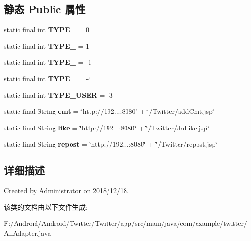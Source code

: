 \subsection*{静态 Public 属性}
\begin{DoxyCompactItemize}
\item 
\mbox{\label{classcom_1_1example_1_1twitter_1_1_all_adapter_aab2cef272665de169b88e509eb07ebe1}} 
static final int {\bfseries T\+Y\+P\+E\+\_} = 0
\item 
\mbox{\label{classcom_1_1example_1_1twitter_1_1_all_adapter_ac4e893228ffc32d25798e88c4b058dd8}} 
static final int {\bfseries T\+Y\+P\+E\+\_} = 1
\item 
\mbox{\label{classcom_1_1example_1_1twitter_1_1_all_adapter_ac3a1bd4e58dd541ebae6aea912ba10e6}} 
static final int {\bfseries T\+Y\+P\+E\+\_} = -\/1
\item 
\mbox{\label{classcom_1_1example_1_1twitter_1_1_all_adapter_a689fca9cb3ac46ce5fe3d409028d404b}} 
static final int {\bfseries T\+Y\+P\+E\+\_} = -\/4
\item 
\mbox{\label{classcom_1_1example_1_1twitter_1_1_all_adapter_acd08e166b930067ca3a858bfcc4ff216}} 
static final int {\bfseries T\+Y\+P\+E\+\_\+\+U\+S\+ER} = -\/3
\item 
\mbox{\label{classcom_1_1example_1_1twitter_1_1_all_adapter_a2a45ab501efdea595e3e683fd4117500}} 
static final String {\bfseries cmt} = \char`\"{}http\+://192...\+:8080\char`\"{} + \char`\"{}/Twitter/add\+Cmt.\+jsp\char`\"{}
\item 
\mbox{\label{classcom_1_1example_1_1twitter_1_1_all_adapter_aee9c225f338582f6b68a134bb87739b1}} 
static final String {\bfseries like} = \char`\"{}http\+://192...\+:8080\char`\"{} + \char`\"{}/Twitter/do\+Like.\+jsp\char`\"{}
\item 
\mbox{\label{classcom_1_1example_1_1twitter_1_1_all_adapter_a7408a1bd184c6066b8af7f7855210191}} 
static final String {\bfseries repost} = \char`\"{}http\+://192...\+:8080\char`\"{} + \char`\"{}/Twitter/repost.\+jsp\char`\"{}
\end{DoxyCompactItemize}


\subsection{详细描述}
Created by Administrator on 2018/12/18. 

该类的文档由以下文件生成\+:\begin{DoxyCompactItemize}
\item 
F\+:/\+Android/\+Android/\+Twitter/\+Twitter/app/src/main/java/com/example/twitter/All\+Adapter.\+java\end{DoxyCompactItemize}
